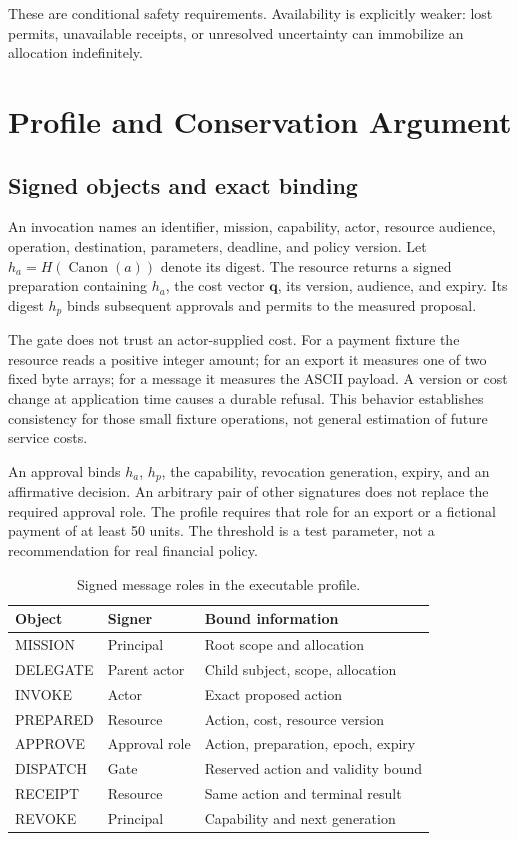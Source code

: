 \documentclass[10pt,journal,a4paper]{IEEEtran}
\newcommand{\Cost}{\mathbf{q}}
\begin{document}
These are conditional safety requirements. Availability is explicitly weaker: lost permits, unavailable receipts, or unresolved uncertainty can immobilize an allocation indefinitely.

\section{Profile and Conservation Argument}
\subsection{Signed objects and exact binding}
An invocation names an identifier, mission, capability, actor, resource audience, operation, destination, parameters, deadline, and policy version. Let $h_a=H(\operatorname{Canon}(a))$ denote its digest. The resource returns a signed preparation containing $h_a$, the cost vector $\Cost$, its version, audience, and expiry. Its digest $h_p$ binds subsequent approvals and permits to the measured proposal.

The gate does not trust an actor-supplied cost. For a payment fixture the resource reads a positive integer amount; for an export it measures one of two fixed byte arrays; for a message it measures the ASCII payload. A version or cost change at application time causes a durable refusal. This behavior establishes consistency for those small fixture operations, not general estimation of future service costs.

An approval binds $h_a$, $h_p$, the capability, revocation generation, expiry, and an affirmative decision. An arbitrary pair of other signatures does not replace the required approval role. The profile requires that role for an export or a fictional payment of at least 50 units. The threshold is a test parameter, not a recommendation for real financial policy.

\begin{table}[t]
\caption{Signed message roles in the executable profile.}
\label{tab:messages}
\centering\small
\begin{tabularx}{\columnwidth}{@{}l l X@{}}
\toprule
Object & Signer & Bound information\\
\midrule
MISSION & Principal & Root scope and allocation\\
DELEGATE & Parent actor & Child subject, scope, allocation\\
INVOKE & Actor & Exact proposed action\\
PREPARED & Resource & Action, cost, resource version\\
APPROVE & Approval role & Action, preparation, epoch, expiry\\
DISPATCH & Gate & Reserved action and validity bound\\
RECEIPT & Resource & Same action and terminal result\\
REVOKE & Principal & Capability and next generation\\
\bottomrule
\end{tabularx}
\end{table}
\end{document}
